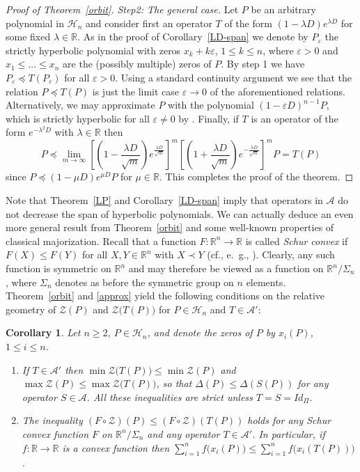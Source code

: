 \documentclass[10pt,twoside,a4paper,reqno]{amsart}
\theoremstyle{plain}
\newtheorem{coro+}           {Corollary}
\theoremstyle{definition}
\theoremstyle{remark}
\newenvironment{corollary}{\begin{coro+}}{\end{coro+}}
\newcommand {\bR} {\mathbb {R}}
\newcommand {\la} {\lambda}
\newcommand {\De} {\Delta}
\newcommand {\ve} {\varepsilon}
\newcommand {\calH} {\mathcal {H}}
\newcommand {\calA} {\mathcal {A}}
\newcommand {\calZ} {\mathcal {Z}}
\newcommand {\vP} {\varPi}
\begin{document}
\begin{proof}[Proof of Theorem~\ref{orbit}]
{\em Step2: The general case.} Let $P$ be an arbitrary polynomial in 
$\calH_n$ and consider first an operator $T$ of the 
form $(1-\la D)e^{\la D}$ for some fixed $\la\in \bR$. As in the proof of 
Corollary~\ref{LD-span} we denote by $P_{\ve}$ the strictly 
hyperbolic polynomial with zeros $x_k+k\ve$, $1\le k\le n$, where 
$\ve>0$ and $x_1\le\ldots\le x_n$ are the (possibly multiple) zeros of $P$. 
By step 1 we have
$P_{\ve}\preccurlyeq T(P_{\ve})$ for all $\ve>0$. Using a standard
continuity argument we see that the relation $P\preccurlyeq T(P)$ is just the 
limit case $\ve\rightarrow 0$ of the aforementioned relations.
Alternatively, we may approximate $P$ with the polynomial $(1-\ve D)^{n-1}P$, 
which is strictly hyperbolic for all $\ve\neq 0$ by \cite[Lemma 4.2]{CC2}. 
Finally, if $T$ is an operator of the form $e^{-\la^2 D}$ with $\la\in \bR$ 
then 
$$P\preccurlyeq\lim_{m\rightarrow \infty}\!
\left[\left(1-\frac{\la D}{\sqrt{m}}\right)
e^{\frac{\la D}{\sqrt{m}}}\right]^{m}
\left[\left(1+\frac{\la D}{\sqrt{m}}\right)
e^{-\frac{\la D}{\sqrt{m}}}\right]^{m}\!P=T(P)$$
since $P\preccurlyeq (1-\mu D)e^{\mu D}P$ for $\mu\in \bR$. This completes 
the proof of the theorem.
\end{proof}

Note that Theorem~\ref{LP} and Corollary~\ref{LD-span} imply that operators in 
$\calA$ do not decrease the span of hyperbolic polynomials. We can actually 
deduce an even more general result from Theorem~\ref{orbit} and some 
well-known properties of classical majorization. Recall that a function 
$F:\bR^n\rightarrow \bR$ is called {\em Schur convex} if $F(X)\le F(Y)$ for 
all $X,Y\in \bR^n$ with $X\prec Y$ (cf., e.~g., \cite{MO}). Clearly, any such 
function is symmetric on $\bR^n$ and may therefore be viewed as a function on 
$\bR^n/\Sigma_n$, where $\Sigma_n$ denotes as before the symmetric group on 
$n$ elements. Theorem~\ref{orbit} and \eqref{approx} yield the 
following conditions on the relative geometry of $\calZ(P)$ and 
$\calZ\big(T(P)\big)$ for $P\in \calH_n$ and $T\in \calA'$:

\begin{corollary}\label{span-A}
Let $n\ge 2$, $P\in \calH_n$, and denote the zeros of $P$ by $x_i(P)$, 
$1\le i\le n$.
\begin{enumerate}
\item[(i)] If $T\in \calA'$ then $\min\calZ\big(T(P)\big)\le \min\calZ(P)$ and 
$\max\calZ(P)\le \max\calZ\big(T(P)\big)$, so that $\De(P)\le \De(S(P))$ for 
any operator $S\in \calA$. All these inequalities are strict unless 
$T=S=Id_{\vP}$.
\item[(ii)] The inequality $(F\circ\calZ)(P)\le (F\circ\calZ)(T(P))$ holds
for any Schur convex function $F$ on $\bR^n/\Sigma_n$ and any operator 
$T\in \calA'$. In 
particular, if $f:\bR\rightarrow \bR$ is a convex function then
$\sum_{i=1}^{n}f\big(x_i(P)\big)\le \sum_{i=1}^{n}f\big(x_i(T(P))\big)$.
\end{enumerate}
\end{corollary}
\end{document}
